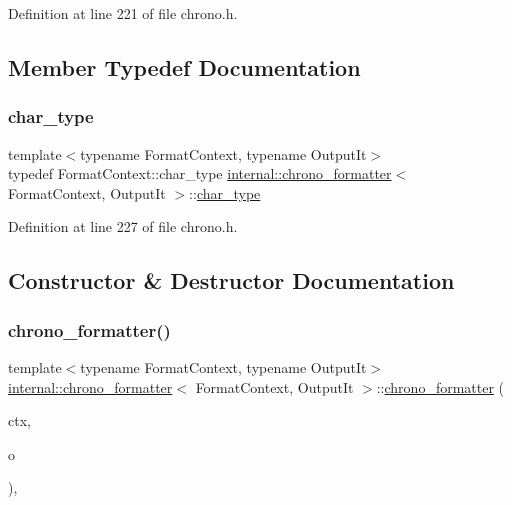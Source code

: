 Definition at line 221 of file chrono.\+h.



\subsection{Member Typedef Documentation}
\mbox{\label{structinternal_1_1chrono__formatter_a48a141d8bc5a48a0c24e19780ba65512}} 
\subsubsection{\texorpdfstring{char\+\_\+type}{char\_type}}
{\footnotesize\ttfamily template$<$typename Format\+Context, typename Output\+It$>$ \\
typedef Format\+Context\+::char\+\_\+type \hyperlink{structinternal_1_1chrono__formatter}{internal\+::chrono\+\_\+formatter}$<$ Format\+Context, Output\+It $>$\+::\hyperlink{structinternal_1_1chrono__formatter_a48a141d8bc5a48a0c24e19780ba65512}{char\+\_\+type}}



Definition at line 227 of file chrono.\+h.



\subsection{Constructor \& Destructor Documentation}
\mbox{\label{structinternal_1_1chrono__formatter_aac86bbd630e23c1b073179ba82d6cdb2}} 
\subsubsection{\texorpdfstring{chrono\+\_\+formatter()}{chrono\_formatter()}}
{\footnotesize\ttfamily template$<$typename Format\+Context, typename Output\+It$>$ \\
\hyperlink{structinternal_1_1chrono__formatter}{internal\+::chrono\+\_\+formatter}$<$ Format\+Context, Output\+It $>$\+::\hyperlink{structinternal_1_1chrono__formatter}{chrono\+\_\+formatter} (\begin{DoxyParamCaption}\item[{Format\+Context \&}]{ctx,  }\item[{Output\+It}]{o }\end{DoxyParamCaption})\hspace{0.3cm}{\ttfamily [inline]}, {\ttfamily [explicit]}}



